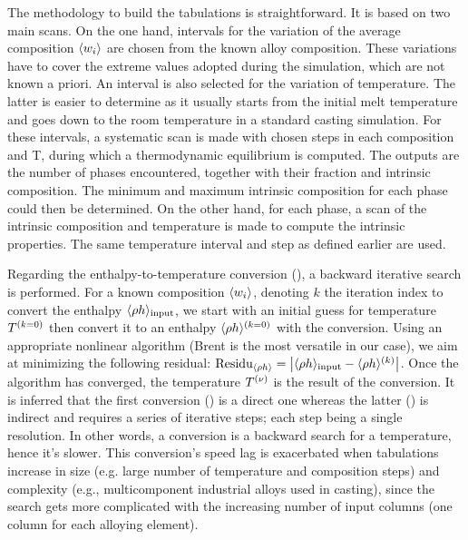 %
The methodology to build the tabulations is straightforward. It is based on two main scans. On the one hand, intervals for the variation of the 
average composition $\langle w_i \rangle$ are chosen from the known alloy composition. These variations have to cover the extreme values adopted during the 
simulation, which are not known a priori. An interval is also selected for the variation of temperature. The latter is easier to determine as it
usually starts from the initial melt temperature and goes down to the room temperature in a standard casting simulation. For these intervals, a 
systematic scan is made with chosen steps in each composition and T, during which a thermodynamic equilibrium is computed. The outputs are the 
number of phases encountered, together with their fraction and intrinsic composition. The minimum and maximum intrinsic composition for each phase 
could then be determined. On the other hand, for each phase, a scan of the intrinsic composition and temperature is made to compute the intrinsic 
properties. The same temperature interval and step as defined earlier are used.

Regarding the enthalpy-to-temperature conversion (\HtoT), a backward iterative \TtoH search is performed. 
For a known composition $\langle w_i \rangle$, denoting $k$ the iteration index to convert the enthalpy 
$\langle \rho h \rangle_{\text{input}}$, we start with an initial guess for temperature $T^{\left( k=0 \right)}$ then convert it to an 
enthalpy  $\langle  \rho h  \rangle^{\left( k=0 \right)}$ with the \TtoH conversion. Using an appropriate nonlinear algorithm (Brent is the most versatile 
in our case), we aim at minimizing the following residual: $\text{Residu}_{\langle  \rho h  \rangle} = \left | \langle  \rho h  \rangle_{\text{input}} - \langle  \rho h  \rangle^{\left( k \right)}  \right |$. 
Once the algorithm has converged, the temperature $T^{{\left( \nu \right)}}$ is the result of the \HtoT conversion. It is 
inferred that the first conversion (\TtoH) is a direct one whereas the latter (\HtoT) is indirect and requires 
a series of iterative steps; each step being a single \TtoH resolution. In other words, a \HtoT conversion is a 
backward search for a temperature, hence it’s slower. This conversion’s speed lag is exacerbated when tabulations 
increase in size (e.g. large number of temperature and composition steps) and complexity (e.g., multicomponent 
industrial alloys used in casting), since the search gets more complicated with the increasing number of input 
columns (one column for each alloying element).
%
%
